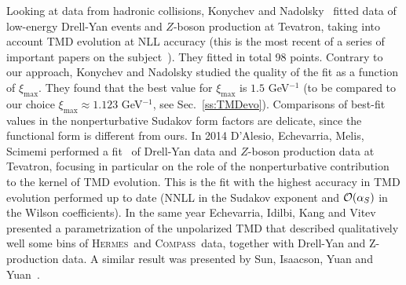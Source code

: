 \documentclass[aps,preprintnumbers,showpacs,nofootinbib,superscriptaddress,floatfix]{revtex4}
\newcommand{\hermes}{\textsc{Hermes}}
\newcommand{\compass}{\textsc{Compass}}
\newcommand{\bb}{\xi}
\begin{document}
Looking at data from hadronic collisions, Konychev and
Nadolsky~\cite{Konychev:2005iy} fitted data of low-energy Drell-Yan events and
$Z$-boson production at Tevatron, taking into account TMD evolution at NLL
accuracy (this is the most recent of a series of important papers on
the subject~\cite{Ladinsky:1993zn,Landry:1999an,Landry:2002ix}). They fitted in total 98
points. Contrary to our approach, Konychev and Nadolsky studied the quality of the fit as a
function of $\bb_{\text{max}}$. They found that the best value for
$\bb_{\text{max}}$ is $1.5$ GeV$^{-1}$ (to be compared to our choice
$\bb_{\text{max}}\approx 1.123$ GeV$^{-1}$, see
Sec.~\ref{ss:TMDevo}). 
 Comparisons of best-fit values in the nonperturbative Sudakov form factors
 are delicate, since the functional form is different from ours. 
In 2014 D'Alesio, Echevarria, Melis, Scimemi performed a
fit~\cite{DAlesio:2014mrz} of Drell-Yan data and $Z$-boson production data at
Tevatron, focusing in particular on the role of the nonperturbative
contribution to the kernel of TMD evolution. This is the fit with the highest
accuracy in TMD evolution performed up to date (NNLL in the Sudakov exponent and ${\cal O}(\alpha_S)$ in the Wilson coefficients). 
In the same year Echevarria, Idilbi, Kang and Vitev~\cite{Echevarria:2014xaa}
presented a parametrization of the unpolarized TMD that described
qualitatively well some bins of \hermes\ and \compass\ data, together with
Drell-Yan and Z-production data.
A similar result was presented by Sun, Isaacson, Yuan and
Yuan~\cite{Su:2014wpa}. 
\end{document}
